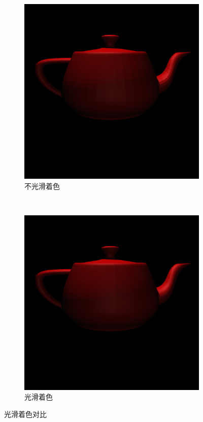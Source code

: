 \begin{figure}
    \centering
    \begin{subfigure}{0.45\textwidth}
        \includegraphics[width=\textwidth]{./img/without_smooth.png}
        \caption{不光滑着色}
    \end{subfigure}
    ~
    \begin{subfigure}{0.45\textwidth}
        \includegraphics[width=\textwidth]{./img/smooth.png}
        \caption{光滑着色}
    \end{subfigure}
    \caption{光滑着色对比}
    \label{fig:smooth}
\end{figure}

